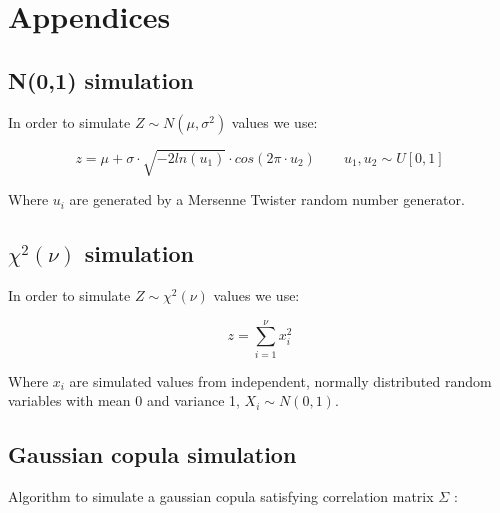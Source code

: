 \documentclass[a4paper,12pt,final]{article}
\begin{document}
\appendix
\section{Appendices}

\subsection{N(0,1) simulation}
\label{ap:normsim}

In order to simulate $Z \sim N(\mu, \sigma^2)$ values we use:

\begin{displaymath}
z = \mu + \sigma\cdot \sqrt{-2 ln(u_1)} \cdot cos(2 \pi \cdot u_2)
\qquad u_1, u_2 \sim U[0,1]
\end{displaymath}

Where $u_i$ are generated by a Mersenne Twister random number generator.

\subsection{$\chi^2(\nu)$ simulation}
\label{ap:chi2sim}

In order to simulate $Z \sim \chi^2(\nu)$ values we use:

\begin{displaymath}
z = \sum_{i=1}^{\nu} x_i^2
\end{displaymath}

Where $x_i$ are simulated values from independent, normally distributed 
random variables with mean 0 and variance 1, $X_i \sim N(0,1)$.

\subsection{Gaussian copula simulation}
\label{ap:gaussiancopu}
Algorithm to simulate a gaussian copula satisfying correlation matrix $\Sigma$ 
\cite{copu:wang} \cite{copu:pricing}:
\end{document}
